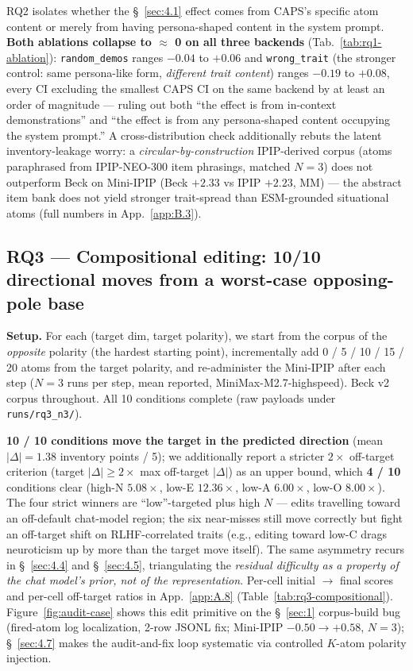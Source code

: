 RQ2 isolates whether the \S~\ref{sec:4.1} effect comes from CAPS's specific atom content or merely from having persona-shaped content in the system prompt. \textbf{Both ablations collapse to $\approx$ 0 on all three backends} (Tab.~\ref{tab:rq1-ablation}): \texttt{random\_\allowbreak{}demos} ranges $-0.04$ to $+0.06$ and \texttt{wrong\_\allowbreak{}trait} (the stronger control: same persona-like form, \textit{different trait content}) ranges $-0.19$ to $+0.08$, every CI excluding the smallest CAPS CI on the same backend by at least an order of magnitude --- ruling out both ``the effect is from in-context demonstrations'' and ``the effect is from any persona-shaped content occupying the system prompt.'' A cross-distribution check additionally rebuts the latent inventory-leakage worry: a \textit{circular-by-construction} IPIP-derived corpus (atoms paraphrased from IPIP-NEO-300 item phrasings, matched $N{=}3$) does not outperform Beck on Mini-IPIP (Beck $+2.33$ vs IPIP $+2.23$, MM) --- the abstract item bank does not yield stronger trait-spread than ESM-grounded situational atoms (full numbers in App.~\ref{app:B.3}).

\subsection{RQ3 --- Compositional editing: 10/10 directional moves from a worst-case opposing-pole base}
\label{sec:4.3}

\textbf{Setup.} For each (target dim, target polarity), we start from the corpus of the \textit{opposite} polarity (the hardest starting point), incrementally add 0 / 5 / 10 / 15 / 20 atoms from the target polarity, and re-administer the Mini-IPIP after each step ($N=3$ runs per step, mean reported, MiniMax-M2.7-highspeed). Beck v2 corpus throughout. All 10 conditions complete (raw payloads under \texttt{runs/\allowbreak{}rq3\_\allowbreak{}n3/\allowbreak{}}).

\textbf{10 / 10 conditions move the target in the predicted direction} (mean $|\Delta| = 1.38$ inventory points / 5); we additionally report a stricter $2\times$ off-target criterion (target $|\Delta| \geq 2\times$ max off-target $|\Delta|$) as an upper bound, which \textbf{4 / 10} conditions clear (high-N $5.08\times$, low-E $12.36\times$, low-A $6.00\times$, low-O $8.00\times$). The four strict winners are ``low''-targeted plus high $N$ --- edits travelling toward an off-default chat-model region; the six near-misses still move correctly but fight an off-target shift on RLHF-correlated traits (e.g., editing toward low-C drags neuroticism up by more than the target move itself). The same asymmetry recurs in \S~\ref{sec:4.4} and \S~\ref{sec:4.5}, triangulating the \textit{residual difficulty as a property of the chat model's prior, not of the representation}. Per-cell initial $\to$ final scores and per-cell off-target ratios in App.~\ref{app:A.8} (Table~\ref{tab:rq3-compositional}). Figure~\ref{fig:audit-case} shows this edit primitive on the \S~\ref{sec:1} corpus-build bug (fired-atom log localization, 2-row JSONL fix; Mini-IPIP $-0.50 \to +0.58$, $N=3$); \S~\ref{sec:4.7} makes the audit-and-fix loop systematic via controlled $K$-atom polarity injection.

